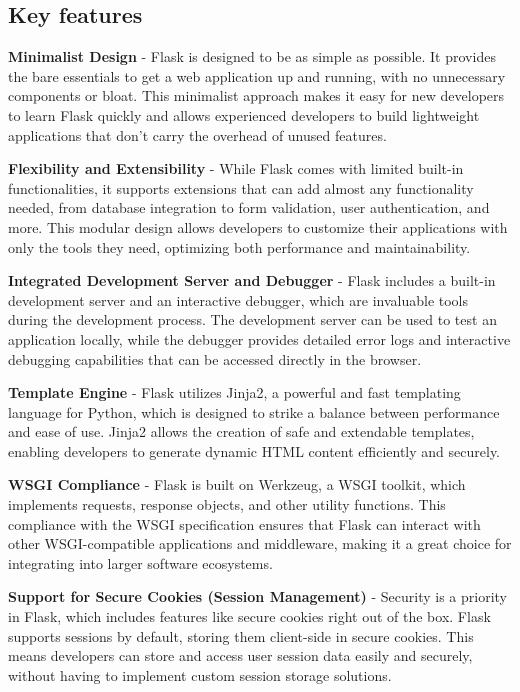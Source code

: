 \subsection{Key features}

\textbf{Minimalist Design} - Flask is designed to be as simple as possible. It provides the bare essentials to get a web application up and running, with no unnecessary components or bloat. This minimalist approach makes it easy for new developers to learn Flask quickly and allows experienced developers to build lightweight applications that don't carry the overhead of unused features.

\textbf{Flexibility and Extensibility} - While Flask comes with limited built-in functionalities, it supports extensions that can add almost any functionality needed, from database integration to form validation, user authentication, and more. This modular design allows developers to customize their applications with only the tools they need, optimizing both performance and maintainability.

\textbf{Integrated Development Server and Debugger} - Flask includes a built-in development server and an interactive debugger, which are invaluable tools during the development process. The development server can be used to test an application locally, while the debugger provides detailed error logs and interactive debugging capabilities that can be accessed directly in the browser.\cite{Grinberg:2018}

\textbf{Template Engine} - Flask utilizes Jinja2, a powerful and fast templating language for Python, which is designed to strike a balance between performance and ease of use. Jinja2 allows the creation of safe and extendable templates, enabling developers to generate dynamic HTML content efficiently and securely.

\textbf{WSGI Compliance} - Flask is built on Werkzeug, a WSGI toolkit, which implements requests, response objects, and other utility functions. This compliance with the WSGI specification ensures that Flask can interact with other WSGI-compatible applications and middleware, making it a great choice for integrating into larger software ecosystems.\cite{Flaskdocs:2024}

\textbf{Support for Secure Cookies (Session Management)} - Security is a priority in Flask, which includes features like secure cookies right out of the box. Flask supports sessions by default, storing them client-side in secure cookies. This means developers can store and access user session data easily and securely, without having to implement custom session storage solutions.

